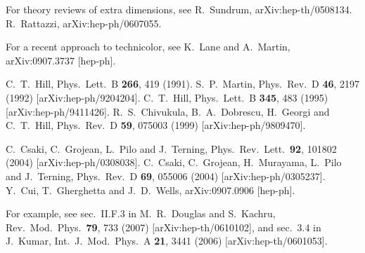 \documentclass[12pt]{article}
\begin{document}
\begin{thebibliography}{9}
For theory reviews of extra dimensions, see
  R.~Sundrum,
  arXiv:hep-th/0508134.
  R.~Rattazzi,
  arXiv:hep-ph/0607055.

For a recent approach to technicolor, see
  K.~Lane and A.~Martin,
  arXiv:0907.3737 [hep-ph].


  C.~T.~Hill,
  Phys.\ Lett.\  B {\bf 266}, 419 (1991).
  S.~P.~Martin,
  Phys.\ Rev.\  D {\bf 46}, 2197 (1992)
  [arXiv:hep-ph/9204204].
  C.~T.~Hill,
  Phys.\ Lett.\  B {\bf 345}, 483 (1995)
  [arXiv:hep-ph/9411426].
  R.~S.~Chivukula, B.~A.~Dobrescu, H.~Georgi and C.~T.~Hill,
  Phys.\ Rev.\  D {\bf 59}, 075003 (1999)
  [arXiv:hep-ph/9809470].

  C.~Csaki, C.~Grojean, L.~Pilo and J.~Terning,
  Phys.\ Rev.\ Lett.\  {\bf 92}, 101802 (2004)
  [arXiv:hep-ph/0308038].
  C.~Csaki, C.~Grojean, H.~Murayama, L.~Pilo and J.~Terning,
  Phys.\ Rev.\  D {\bf 69}, 055006 (2004)
  [arXiv:hep-ph/0305237].
  Y.~Cui, T.~Gherghetta and J.~D.~Wells,
  arXiv:0907.0906 [hep-ph].


For example, see sec.\ II.F.3 in
  M.~R.~Douglas and S.~Kachru,
  Rev.\ Mod.\ Phys.\  {\bf 79}, 733 (2007)
  [arXiv:hep-th/0610102],
and sec.\ 3.4 in
  J.~Kumar,
  Int.\ J.\ Mod.\ Phys.\  A {\bf 21}, 3441 (2006)
  [arXiv:hep-th/0601053].


\end{thebibliography}
\end{document}
